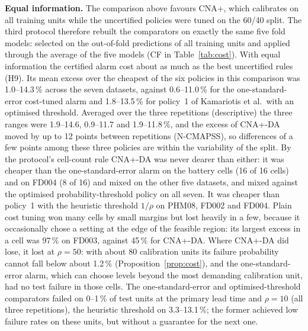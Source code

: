 \textbf{Equal information.} The comparison above favours CNA+, which calibrates on all training units while the uncertified policies were tuned on the 60/40 split. The third protocol therefore rebuilt the comparators on exactly the same five fold models: selected on the out-of-fold predictions of all training units and applied through the average of the five models (CF in Table~\ref{tab:cost}). With equal information the certified alarm cost about as much as the best uncertified rules (H9). Its mean excess over the cheapest of the six policies in this comparison was 1.0--14.3\,\% across the seven datasets, against 0.6--11.0\,\% for the one-standard-error cost-tuned alarm and 1.8--13.5\,\% for policy~1 of Kamariotis et al.\ with an optimised threshold. Averaged over the three repetitions (descriptive) the three ranges were 1.9--14.6, 0.9--11.7 and 1.9--11.8\,\%, and the excess of CNA+-DA moved by up to 12 points between repetitions (N-CMAPSS), so differences of a few points among these three policies are within the variability of the split. By the protocol's cell-count rule CNA+-DA was never dearer than either: it was cheaper than the one-standard-error alarm on the battery cells (16 of 16 cells) and on FD004 (8 of 16) and mixed on the other five datasets, and mixed against the optimised probability-threshold policy on all seven. It was cheaper than policy~1 with the heuristic threshold $1/\rho$ on PHM08, FD002 and FD004. Plain cost tuning won many cells by small margins but lost heavily in a few, because it occasionally chose a setting at the edge of the feasible region: its largest excess in a cell was 97\,\% on FD003, against 45\,\% for CNA+-DA. Where CNA+-DA did lose, it lost at $\rho=50$: with about 80 calibration units its failure probability cannot fall below about 1.2\,\% (Proposition~\ref{prop:cost}), and the one-standard-error alarm, which can choose levels beyond the most demanding calibration unit, had no test failure in those cells. The one-standard-error and optimised-threshold comparators failed on 0--1\,\% of test units at the primary lead time and $\rho=10$ (all three repetitions), the heuristic threshold on 3.3--13.1\,\%; the former achieved low failure rates on these units, but without a guarantee for the next one.
